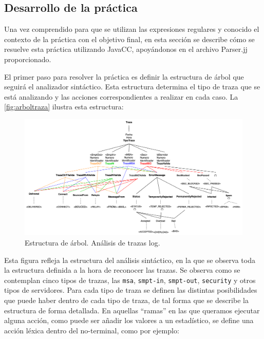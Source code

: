 \subsection{Desarrollo de la práctica}

Una vez comprendido para que se utilizan las expresiones regulares y conocido el contexto de la práctica con el objetivo final, en esta sección se describe cómo se resuelve esta práctica utilizando JavaCC, apoyándonos en el archivo Parser.jj proporcionado.

El primer paso para resolver la práctica es definir la estructura de árbol que seguirá el analizador sintáctico. Esta estructura determina el tipo de traza que se está analizando y las acciones correspondientes a realizar en cada caso. La \autoref{fig:arboltraza} ilustra esta estructura:

\begin{figure}[H]
    \centering
    \includegraphics[width=\textwidth]{imagenes/arboltraza.png}
    \caption{Estructura de árbol. Análisis de trazas log.}
    \label{fig:arboltraza}
\end{figure}

Esta figura refleja la estructura del análisis sintáctico, en la que se observa toda la estructura definida a la hora de reconocer las trazas. Se observa como se contemplan cinco tipos de trazas, las \lstinline|msa|, \lstinline|smpt-in|, \lstinline|smpt-out|, \lstinline|security| y otros tipos de servidores. Para cada tipo de traza se definen las distintas posibilidades que puede haber dentro de cada tipo de traza, de tal forma que se describe la estructura de forma detallada. En aquellas ``ramas'' en las que queramos ejecutar alguna acción, como puede ser añadir los valores a un estadístico, se define una acción léxica dentro del no-terminal, como por ejemplo:

\lstset{inputencoding=utf8/latin1}


